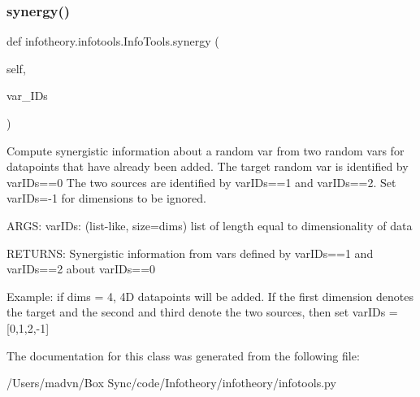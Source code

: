 \subsubsection{\texorpdfstring{synergy()}{synergy()}}
{\footnotesize\ttfamily def infotheory.\+infotools.\+Info\+Tools.\+synergy (\begin{DoxyParamCaption}\item[{}]{self,  }\item[{}]{var\+\_\+\+I\+Ds }\end{DoxyParamCaption})}

\begin{DoxyVerb}Compute synergistic information about a random var from two random vars for datapoints that have already been added.
The target random var is identified by varIDs==0
The two sources are identified by varIDs==1 and varIDs==2.
Set varIDs=-1 for dimensions to be ignored.

ARGS:
varIDs: (list-like, size=dims) list of length equal to dimensionality of data

RETURNS:
Synergistic information from vars defined by varIDs==1 and varIDs==2 about varIDs==0

Example:
if dims = 4, 4D datapoints will be added. If the first dimension denotes the target and the second and third denote the two sources, then set
varIDs = [0,1,2,-1]
\end{DoxyVerb}
 

The documentation for this class was generated from the following file\+:\begin{DoxyCompactItemize}
\item 
/\+Users/madvn/\+Box Sync/code/\+Infotheory/infotheory/infotools.\+py\end{DoxyCompactItemize}

